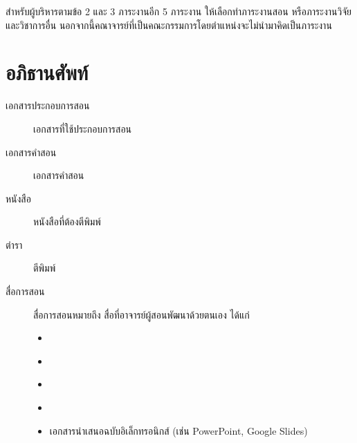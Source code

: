 \documentclass[a4paper,12pt,english]{sphinxmanual}
\begin{document}
สำหรับผู้บริหารตามข้อ 2 และ 3 ภาระงานอีก 5 ภาระงาน ให้เลือกทำภาระงานสอน หรือภาระงานวิจัยและวิชาการอื่น นอกจากนี้คณาจารย์ที่เป็นคณะกรรมการโดยตำแหน่งจะไม่นำมาคิดเป็นภาระงาน


\chapter{อภิธานศัพท์}
\label{\detokenize{glossary:id1}}\label{\detokenize{glossary::doc}}\begin{description}
\item[{เอกสารประกอบการสอน\label{\detokenize{glossary:term-0}}}] \leavevmode
เอกสารที่ใช้ประกอบการสอน

\item[{เอกสารคำสอน\label{\detokenize{glossary:term-1}}}] \leavevmode
เอกสารคำสอน

\item[{หนังสือ\label{\detokenize{glossary:term-2}}}] \leavevmode
หนังสือที่ต้องตีพิมพ์

\item[{ตำรา\label{\detokenize{glossary:term-3}}}] \leavevmode
ตีพิมพ์

\item[{สื่อการสอน\label{\detokenize{glossary:term-4}}}] \leavevmode
สื่อการสอนหมายถึง สื่อที่อาจารย์ผู้สอนพัฒนาด้วยตนเอง ได้แก่
\begin{itemize}
\item {} 
{\hyperref[\detokenize{glossary:term-0}]{}}

\item {} 
{\hyperref[\detokenize{glossary:term-1}]{}}

\item {} 
{\hyperref[\detokenize{glossary:term-2}]{}}

\item {} 
{\hyperref[\detokenize{glossary:term-3}]{}}

\item {} 
เอกสารนำเสนอฉบับอิเล็กทรอนิกส์ (เช่น PowerPoint, Google Slides)


\end{itemize}
\end{description}
\end{document}
